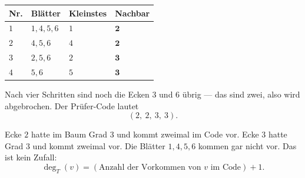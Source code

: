 \begin{merksatz}
\begin{center}
\end{center}

\begin{center}
{\small
\renewcommand{\arraystretch}{1.4}
\begin{tabular}{@{}P{1.2cm}P{2.8cm}P{1.8cm}P{1.6cm}@{}}
\toprule
\textbf{Nr.} & \textbf{Blätter} & \textbf{Kleinstes} & \textbf{Nachbar}\\
\midrule
$1$ & $1, 4, 5, 6$ & $1$ & $\mathbf{2}$\\
$2$ & $4, 5, 6$ & $4$ & $\mathbf{2}$\\
$3$ & $2, 5, 6$ & $2$ & $\mathbf{3}$\\
$4$ & $5, 6$ & $5$ & $\mathbf{3}$\\
\bottomrule
\end{tabular}}
\end{center}

Nach vier Schritten sind noch die Ecken $3$ und $6$ übrig --- das sind zwei, also wird abgebrochen. Der Prüfer-Code lautet
\[ (2,\ 2,\ 3,\ 3) . \]

Ecke $2$ hatte im Baum Grad $3$ und kommt zweimal im Code vor. Ecke $3$ hatte Grad $3$ und kommt zweimal vor. Die Blätter $1, 4, 5, 6$ kommen gar nicht vor. Das ist kein Zufall:
\[ \deg_T(v) = (\text{Anzahl der Vorkommen von } v \text{ im Code}) + 1 . \]
\end{merksatz}

